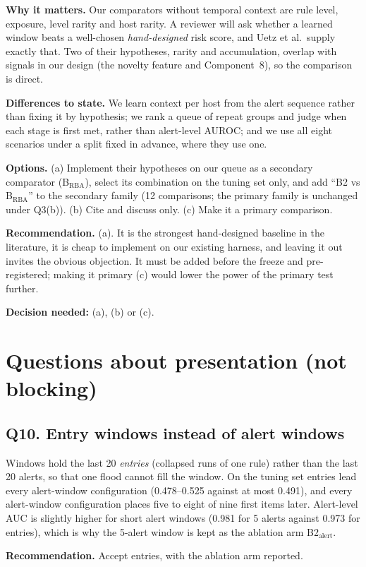 \documentclass[10.5pt,a4paper]{article}
\newcommand{\rec}[1]{\par\smallskip\noindent\colorbox{gray!12}{\parbox{\dimexpr\linewidth-2\fboxsep}{\textbf{Recommendation.} #1}}\par\smallskip}
\newcommand{\ask}[1]{\par\noindent\textbf{Decision needed:} #1\par\medskip}
\newcommand{\sub}[1]{\par\smallskip\noindent\textbf{#1}\quad}
\begin{document}
\sub{Why it matters.} Our comparators without temporal context are rule level, exposure, level rarity and host rarity. A reviewer will ask whether a learned window beats a well-chosen \emph{hand-designed} risk score, and Uetz et al.\ supply exactly that. Two of their hypotheses, rarity and accumulation, overlap with signals in our design (the novelty feature and Component~8), so the comparison is direct.

\sub{Differences to state.} We learn context per host from the alert sequence rather than fixing it by hypothesis; we rank a queue of repeat groups and judge when each stage is first met, rather than alert-level AUROC; and we use all eight scenarios under a split fixed in advance, where they use one.

\sub{Options.} (a) Implement their hypotheses on our queue as a secondary comparator (B$_\mathrm{RBA}$), select its combination on the tuning set only, and add ``B2 vs B$_\mathrm{RBA}$'' to the secondary family (12 comparisons; the primary family is unchanged under Q3(b)). (b) Cite and discuss only. (c) Make it a primary comparison.

\rec{(a). It is the strongest hand-designed baseline in the literature, it is cheap to implement on our existing harness, and leaving it out invites the obvious objection. It must be added before the freeze and pre-registered; making it primary (c) would lower the power of the primary test further.}
\ask{(a), (b) or (c).}

\section{Questions about presentation (not blocking)}
\label{sec:presentation}

\subsection*{Q10. Entry windows instead of alert windows}
Windows hold the last 20 \emph{entries} (collapsed runs of one rule) rather than the last 20 alerts, so that one flood cannot fill the window. On the tuning set entries lead every alert-window configuration (0.478--0.525 against at most 0.491), and every alert-window configuration places five to eight of nine first items later. Alert-level AUC is slightly higher for short alert windows (0.981 for 5 alerts against 0.973 for entries), which is why the 5-alert window is kept as the ablation arm B2$_\mathrm{alert}$.
\rec{Accept entries, with the ablation arm reported.}
\end{document}
